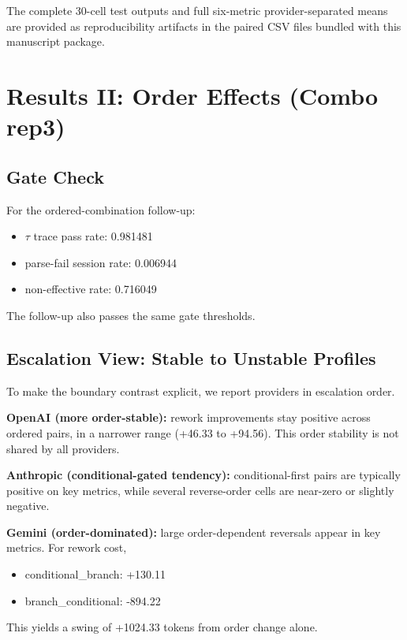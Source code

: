 \documentclass[11pt,a4paper]{article}
\begin{document}
The complete 30-cell test outputs and full six-metric provider-separated means are provided as reproducibility artifacts in the paired CSV files bundled with this manuscript package.

\section{Results II: Order Effects (Combo rep3)}
\label{sec:results_combo}

\subsection{Gate Check}

For the ordered-combination follow-up:
\begin{itemize}
  \item $\tau$ trace pass rate: 0.981481
  \item parse-fail session rate: 0.006944
  \item non-effective rate: 0.716049
\end{itemize}

The follow-up also passes the same gate thresholds.

\subsection{Escalation View: Stable to Unstable Profiles}

To make the boundary contrast explicit, we report providers in escalation order.

\textbf{OpenAI (more order-stable):}
rework improvements stay positive across ordered pairs, in a narrower range (+46.33 to +94.56).
This order stability is not shared by all providers.

\textbf{Anthropic (conditional-gated tendency):}
conditional-first pairs are typically positive on key metrics, while several reverse-order cells are near-zero or slightly negative.

\textbf{Gemini (order-dominated):}
large order-dependent reversals appear in key metrics. For rework cost,
\begin{itemize}
  \item conditional\_branch: +130.11
  \item branch\_conditional: -894.22
\end{itemize}
This yields a swing of +1024.33 tokens from order change alone.
\end{document}
